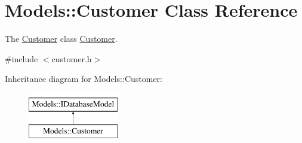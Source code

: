 \hypertarget{classModels_1_1Customer}{\section{Models\+:\+:Customer Class Reference}
\label{classModels_1_1Customer}
}


The \hyperlink{classModels_1_1Customer}{Customer} class \hyperlink{classModels_1_1Customer}{Customer}.  




{\ttfamily \#include $<$customer.\+h$>$}

Inheritance diagram for Models\+:\+:Customer\+:\begin{figure}[H]
\begin{center}
\leavevmode
\includegraphics[height=2.000000cm]{db/dd7/classModels_1_1Customer}
\end{center}
\end{figure}
